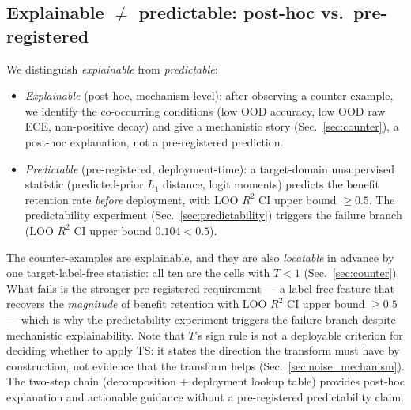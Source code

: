 \documentclass[review,12pt,nonatbib]{elsarticle}
\begin{document}
\subsection{Explainable $\neq$ predictable: post-hoc vs.\ pre-registered}
We distinguish \emph{explainable} from \emph{predictable}:
\begin{itemize}
    \item \emph{Explainable} (post-hoc, mechanism-level): after
    observing a counter-example, we identify the co-occurring
    conditions (low OOD accuracy, low OOD raw ECE, non-positive
    decay) and give a mechanistic story (Sec.~\ref{sec:counter}), a
    post-hoc explanation, not a pre-registered prediction.
    \item \emph{Predictable} (pre-registered, deployment-time): a
    target-domain unsupervised statistic (predicted-prior $L_1$
    distance, logit moments) predicts the benefit retention rate
    \emph{before} deployment, with LOO $R^2$ CI upper bound
    $\geq 0.5$. The predictability experiment
    (Sec.~\ref{sec:predictability}) triggers the failure branch
    (LOO $R^2$ CI upper bound $0.104<0.5$).
\end{itemize}
The counter-examples are explainable, and they are also \emph{locatable}
in advance by one target-label-free statistic: all ten are the cells
with $T<1$ (Sec.~\ref{sec:counter}). What fails is the stronger
pre-registered requirement --- a label-free feature that recovers the
\emph{magnitude} of benefit retention with LOO $R^2$ CI upper bound
$\geq 0.5$ --- which is why the predictability experiment triggers the
failure branch despite mechanistic explainability. Note that $T$'s sign
rule is not a deployable criterion for deciding whether to apply TS: it
states the direction the transform must have by construction, not
evidence that the transform helps (Sec.~\ref{sec:noise_mechanism}). The
two-step chain (decomposition + deployment
lookup table) provides post-hoc explanation and actionable guidance
without a pre-registered predictability claim.

\end{document}
